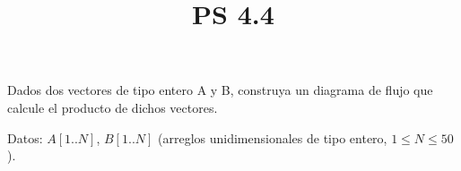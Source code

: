 \documentclass[11pt]{amsart}
\title{PS 4.4}
\begin{document}
\maketitle
\noindent  Dados dos vectores de tipo entero A y B, construya un diagrama de flujo que calcule el producto de dichos vectores. \newline

\noindent  Datos: $A[1..N]$, $B[1..N]$ (arreglos unidimensionales de tipo entero, $1 \leq  N \leq 50$).
\end{document}

